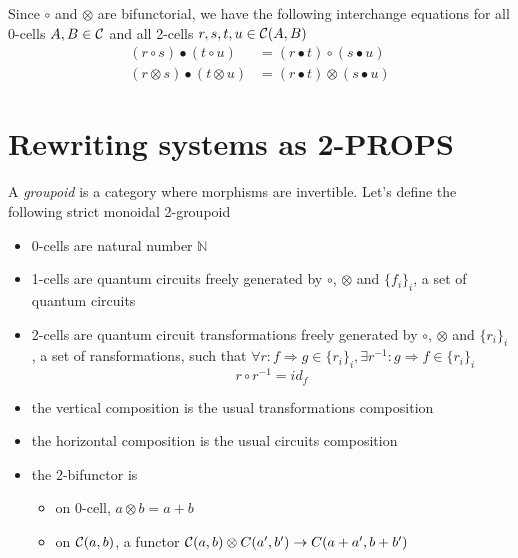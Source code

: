 \documentclass[a4paper]{article}
\begin{document}
\begin{remark}
Since $\circ$ and $\otimes$ are bifunctorial, we have the following
interchange equations for all 0-cells $A, B \in {\cal C}$ and all 2-cells $r, s, t, u \in {\cal C}(A, B)$
\begin{align}
(r \circ s) \bullet (t \circ u) &= (r \bullet t) \circ (s \bullet u) \\
(r \otimes s) \bullet (t \otimes u) &= (r \bullet t) \otimes (s \bullet u)
\end{align}
\end{remark}

\section{Rewriting systems as 2-PROPS}
\label{sec:rewriting}

\begin{definition}
A \emph{groupoid} is a category where morphisms are invertible.
Let's define the following strict monoidal 2-groupoid \catC

\begin{itemize}
\item 0-cells are natural number $\mathbb{N}$
\item 1-cells are quantum circuits freely generated by $\circ$, $\otimes$ and $\{f_i\}_i$, a set of quantum circuits
\item 2-cells are quantum circuit transformations freely generated by $\circ$, $\otimes$ and $\{r_i\}_i$, a set of ransformations, such that $\forall r: f \Rightarrow g \in \{r_i\}_i, \exists r^{-1}: g \Rightarrow f \in \{r_i\}_i$
\[
r \circ r^{-1} = id_f
\]
\item the vertical composition is the usual transformations composition
\item the horizontal composition is the usual circuits composition
\item the 2-bifunctor is
\begin{itemize}
\item on 0-cell, $a \otimes b = a + b$
\item on ${\cal C}(a, b)$, a functor ${\cal C}(a, b) \otimes C(a', b') \to C(a + a', b + b')$
\end{itemize}
\end{itemize}
\end{definition}
\end{document}
